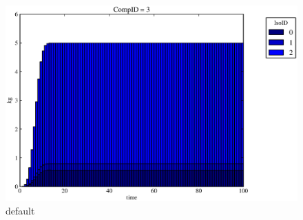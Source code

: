 \begin{figure}[ht]
\begin{minipage}[b]{0.45\linewidth}
\includegraphics[width=\textwidth]{./chapters/demonstration/no_release/buff0deg3.eps}
\caption{default}
\label{fig:figure2}
\end{minipage}
\end{figure}
